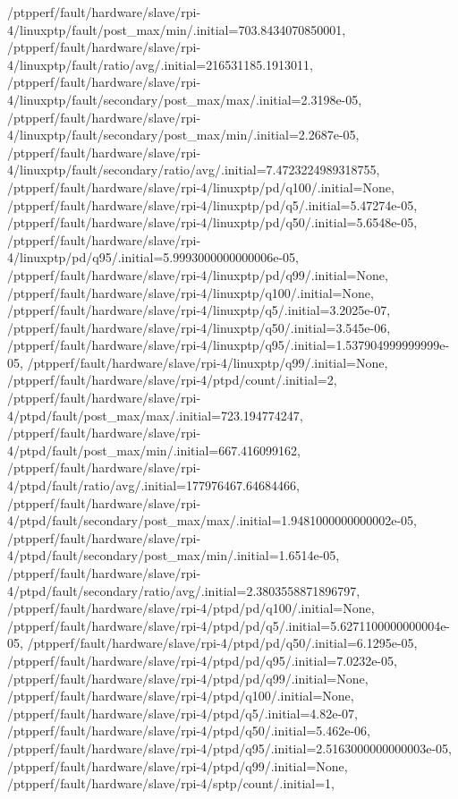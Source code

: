 {    /ptpperf/fault/hardware/slave/rpi-4/linuxptp/fault/post_max/min/.initial=703.8434070850001,
    /ptpperf/fault/hardware/slave/rpi-4/linuxptp/fault/ratio/avg/.initial=216531185.1913011,
    /ptpperf/fault/hardware/slave/rpi-4/linuxptp/fault/secondary/post_max/max/.initial=2.3198e-05,
    /ptpperf/fault/hardware/slave/rpi-4/linuxptp/fault/secondary/post_max/min/.initial=2.2687e-05,
    /ptpperf/fault/hardware/slave/rpi-4/linuxptp/fault/secondary/ratio/avg/.initial=7.4723224989318755,
    /ptpperf/fault/hardware/slave/rpi-4/linuxptp/pd/q100/.initial=None,
    /ptpperf/fault/hardware/slave/rpi-4/linuxptp/pd/q5/.initial=5.47274e-05,
    /ptpperf/fault/hardware/slave/rpi-4/linuxptp/pd/q50/.initial=5.6548e-05,
    /ptpperf/fault/hardware/slave/rpi-4/linuxptp/pd/q95/.initial=5.9993000000000006e-05,
    /ptpperf/fault/hardware/slave/rpi-4/linuxptp/pd/q99/.initial=None,
    /ptpperf/fault/hardware/slave/rpi-4/linuxptp/q100/.initial=None,
    /ptpperf/fault/hardware/slave/rpi-4/linuxptp/q5/.initial=3.2025e-07,
    /ptpperf/fault/hardware/slave/rpi-4/linuxptp/q50/.initial=3.545e-06,
    /ptpperf/fault/hardware/slave/rpi-4/linuxptp/q95/.initial=1.537904999999999e-05,
    /ptpperf/fault/hardware/slave/rpi-4/linuxptp/q99/.initial=None,
    /ptpperf/fault/hardware/slave/rpi-4/ptpd/count/.initial=2,
    /ptpperf/fault/hardware/slave/rpi-4/ptpd/fault/post_max/max/.initial=723.194774247,
    /ptpperf/fault/hardware/slave/rpi-4/ptpd/fault/post_max/min/.initial=667.416099162,
    /ptpperf/fault/hardware/slave/rpi-4/ptpd/fault/ratio/avg/.initial=177976467.64684466,
    /ptpperf/fault/hardware/slave/rpi-4/ptpd/fault/secondary/post_max/max/.initial=1.9481000000000002e-05,
    /ptpperf/fault/hardware/slave/rpi-4/ptpd/fault/secondary/post_max/min/.initial=1.6514e-05,
    /ptpperf/fault/hardware/slave/rpi-4/ptpd/fault/secondary/ratio/avg/.initial=2.3803558871896797,
    /ptpperf/fault/hardware/slave/rpi-4/ptpd/pd/q100/.initial=None,
    /ptpperf/fault/hardware/slave/rpi-4/ptpd/pd/q5/.initial=5.6271100000000004e-05,
    /ptpperf/fault/hardware/slave/rpi-4/ptpd/pd/q50/.initial=6.1295e-05,
    /ptpperf/fault/hardware/slave/rpi-4/ptpd/pd/q95/.initial=7.0232e-05,
    /ptpperf/fault/hardware/slave/rpi-4/ptpd/pd/q99/.initial=None,
    /ptpperf/fault/hardware/slave/rpi-4/ptpd/q100/.initial=None,
    /ptpperf/fault/hardware/slave/rpi-4/ptpd/q5/.initial=4.82e-07,
    /ptpperf/fault/hardware/slave/rpi-4/ptpd/q50/.initial=5.462e-06,
    /ptpperf/fault/hardware/slave/rpi-4/ptpd/q95/.initial=2.5163000000000003e-05,
    /ptpperf/fault/hardware/slave/rpi-4/ptpd/q99/.initial=None,
    /ptpperf/fault/hardware/slave/rpi-4/sptp/count/.initial=1,
}
